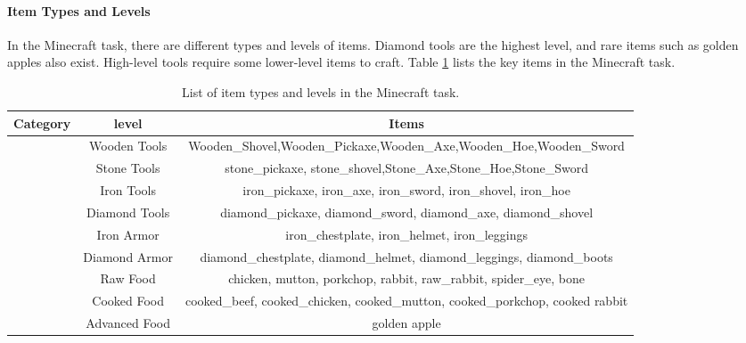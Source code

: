 \paragraph{Item Types and Levels}
In the Minecraft task, there are different types and levels of items. Diamond tools are the highest level, and rare items such as golden apples also exist. High-level tools require some lower-level items to craft. Table \ref{tab:toollist} lists the key items in the Minecraft task.
\begingroup
\begin{table}[H]
\caption{List of item types and levels in the Minecraft task.}
\label{tab:toollist}
\vskip -0.1in
\setlength{\tabcolsep}{10pt} %
\begin{center}
\begin{small}
\begin{sc}
\begin{tabular}{l|c|c}
\toprule
\textnormal{\textbf{Category}} & \textnormal{\textbf{level}} & \textnormal{\textbf{Items}} \\
\midrule         
\midrule
\multirow{4}{*}{\multirow{3}{*}{\normalfont Tools}} 
              & \normalfont Wooden Tools & \normalfont Wooden\_Shovel,Wooden\_Pickaxe,Wooden\_Axe,Wooden\_Hoe,Wooden\_Sword \\
              \cmidrule{2-3}
              & \normalfont Stone Tools &\normalfont stone\_pickaxe, stone\_shovel,Stone\_Axe,Stone\_Hoe,Stone\_Sword   \\
              \cmidrule{2-3}
              & \normalfont Iron Tools &\normalfont iron\_pickaxe, iron\_axe, iron\_sword, iron\_shovel, iron\_hoe    \\
              \cmidrule{2-3}
              & \normalfont Diamond Tools &\normalfont diamond\_pickaxe, diamond\_sword, diamond\_axe, diamond\_shovel    \\
             
\midrule
\multirow{2}{*}{\multirow{1}{*}{\normalfont  Armor}} 
              & \normalfont Iron Armor &\normalfont iron\_chestplate, iron\_helmet, iron\_leggings  \\
              \cmidrule{2-3}
              & \normalfont Diamond Armor &\normalfont diamond\_chestplate, diamond\_helmet, diamond\_leggings, diamond\_boots     \\

\midrule
\multirow{3}{*}{\multirow{2}{*}{\normalfont  Food}} 
              & \normalfont Raw Food &\normalfont chicken, mutton, porkchop, rabbit, raw\_rabbit, spider\_eye, bone  \\
              \cmidrule{2-3}
              & \normalfont Cooked Food &\normalfont cooked\_beef, cooked\_chicken, cooked\_mutton, cooked\_porkchop, cooked rabbit  \\
              \cmidrule{2-3}
              & \normalfont Advanced Food &\normalfont golden apple    \\

\bottomrule
\end{tabular}
\end{sc}
\end{small}
\end{center}
\vskip -0.1in
\end{table}
\endgroup


